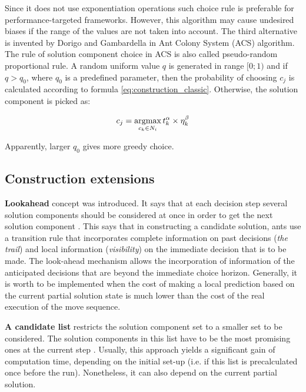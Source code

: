 \documentclass[12pt,a4paper,oneside]{book}
\begin{document}
Since it does not use exponentiation operations such choice rule is preferable for performance-targeted frameworks. However, this algorithm may cause undesired biases if the range of the values are not taken into account. The third alternative is invented by Dorigo and Gambardella \cite{Dorigo1997} in Ant Colony System (ACS) algorithm. The rule of solution component choice in ACS is also called pseudo-random proportional rule. A random uniform value $q$ is generated in range $[0;1)$ and if $q>q_0$, where $q_0$ is a predefined parameter, then the probability of choosing $c_j$ is calculated according to formula \eqref{eq:construction_classic}. Otherwise, the solution component is picked as:

\begin{equation}
c_j = \operatornamewithlimits{argmax}\limits_{c_k \in N_i} t_k^\alpha \times \eta_k^\beta
\label{eq:construction_dorigo}
\end{equation}

Apparently, larger $q_0$ gives more greedy choice.

\subsection{Construction extensions}

\textbf{Lookahead} concept was introduced. It says that at each decision step several solution components should be considered at once in order to get the next solution component \cite{10.1007/BFb0056911}. This says that in constructing a candidate solution, ants use a transition rule that incorporates complete information on past decisions (\emph{the trail}) and local information (\emph{visibility}) on the immediate decision that is to be made. The look-ahead mechanism allows the incorporation of information of the anticipated decisions that are beyond the immediate choice horizon. Generally, it is worth to be implemented when the cost of making a local prediction based on the current partial solution state is much lower than the cost of the real execution of the move sequence.

\textbf{A candidate list} restricts the solution component set to a smaller set to be considered. The solution components in this list have to be the most promising ones at the current step \cite{782657,Dorigo1997}. Usually, this approach yields a significant gain of computation time, depending on the initial set-up (i.e. if this list is precalculated once before the run). Nonetheless, it can also depend on the current partial solution.
\end{document}
